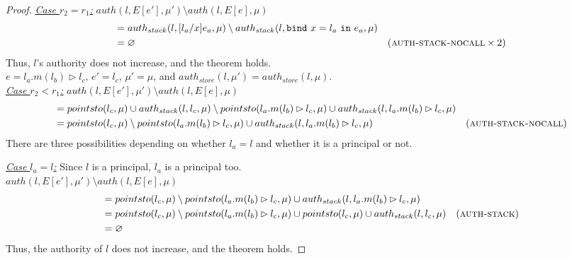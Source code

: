 \documentclass{llncs}
\newcommand{\keywadj}[1]{\mathtt{#1}}
\newcommand{\keyw}[1]{\keywadj{#1}~}
\begin{document}
\begin{proof}
\noindent\underline{\underline{\textit{Case $r_2 = r_1$:}}}
$auth(l, E[e'], \mu') \setminus auth(l, E[e], \mu)$
\vspace{-7pt}
\begin{align*}
&= auth_{stack}(l, [l_a/x]e_a, \mu) \setminus auth_{stack}(l, \keyw{bind} x = l_a~\keyw{in} e_a, \mu)\\
&= \varnothing & (\textsc{auth-stack-nocall} \times 2)
\end{align*}
Thus, $l$'s authority does not increase, and the theorem holds.\\


\noindent{}
$e = l_a.m(l_b) \rhd l_c$, $e' = l_c$, $\mu' = \mu$, and $auth_{store}(l, \mu') = auth_{store}(l, \mu)$.\\

\noindent\underline{\underline{\textit{Case $r_2 < r_1$:}}}
$auth(l, E[e'], \mu') \setminus auth(l, E[e], \mu)$
\vspace{-7pt}
\begin{align*}
&= pointsto(l_c, \mu) \cup auth_{stack}(l, l_c, \mu) \setminus pointsto(l_a.m(l_b) \rhd l_c, \mu) \cup auth_{stack}(l, l_a.m(l_b) \rhd l_c, \mu)\\
&= pointsto(l_c, \mu) \setminus pointsto(l_a.m(l_b) \rhd l_c, \mu) \cup auth_{stack}(l, l_a.m(l_b) \rhd l_c, \mu) & (\textsc{auth-stack-nocall})
\end{align*}
There are three possibilities depending on whether $l_a = l$ and whether it is a principal or not.

\noindent\underline{\textit{Case $l_a = l$:}} Since $l$ is a principal, $l_a$ is a principal too.\\
\noindent$auth(l, E[e'], \mu') \setminus auth(l, E[e], \mu)$
\vspace{-7pt}
\begin{align*}
&= pointsto(l_c, \mu) \setminus pointsto(l_a.m(l_b) \rhd l_c, \mu) \cup auth_{stack}(l, l_a.m(l_b) \rhd l_c, \mu)\\
&= pointsto(l_c, \mu) \setminus pointsto(l_a.m(l_b) \rhd l_c, \mu) \cup pointsto(l_c, \mu) \cup auth_{stack}(l, l_c, \mu) & (\textsc{auth-stack})\\
&= \varnothing
\end{align*}
Thus, the authority of $l$ does not increase, and the theorem holds.


\end{proof}
\end{document}
